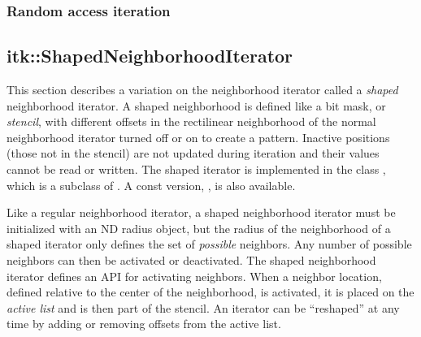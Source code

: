 {\subsubsection{Random access iteration}
\label{sec:NeighborhoodExample6}




\subsection{itk::ShapedNeighborhoodIterator}
\label{sec:itkShapedNeighborhoodIterator}
This section describes a variation on the neighborhood iterator called a
\emph{shaped} neighborhood iterator.  A shaped neighborhood is defined like
a bit mask, or \emph{stencil}, with different offsets in the rectilinear
neighborhood of the normal neighborhood iterator turned off or on to create a
pattern.  Inactive positions (those not in the stencil) are not updated during
iteration and their values cannot be read or written.  The shaped iterator is
implemented in the class , which is a
subclass of
.  A const version,
, is also available.

Like a regular neighborhood iterator, a shaped neighborhood iterator must be
initialized with an ND radius object, but the radius of the neighborhood of a
shaped iterator only defines the set of \emph{possible} neighbors.  Any number
of possible neighbors can then be activated or deactivated.  The shaped
neighborhood iterator defines an API for activating neighbors.  When a neighbor
location, defined relative to the center of the neighborhood, is activated, it
is placed on the \emph{active list} and is then part of the stencil.  An
iterator can be ``reshaped'' at any time by adding or removing offsets from the
active list.

}
